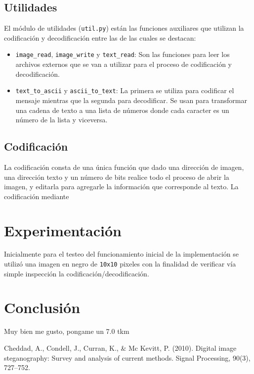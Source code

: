 \documentclass[conference]{IEEEtran}
\begin{document}
	\subsection*{Utilidades}
	El módulo de utilidades (\texttt{util.py}) están las funciones auxiliares que utilizan la codificación y decodificación entre las de las cuales se destacan:
	\begin{itemize}
	    \item \texttt{image\_read}\footnotemark, \texttt{image\_write} y \texttt{text\_read}: Son las funciones para leer los archivos externos que se van a utilizar para el proceso de codificación y decodificación.
         
	    	    
        \item \texttt{text\_to\_ascii} y \texttt{ascii\_to\_text}: La primera se utiliza para codificar el mensaje mientras que la segunda para decodificar. Se usan para transformar una cadena de texto a una lista de números donde cada caracter es un número de la lista y viceversa.
        
	\end{itemize}
	
    	
	
	\subsection*{Codificación}
        La codificación consta de una única función que dado una dirección de imagen, una dirección texto y un número de bits realice todo el proceso de abrir la imagen, y editarla para agregarle la información que corresponde al texto.
        La codificación mediante
	
\section*{Experimentación}
    Inicialmente para el testeo del funcionamiento inicial de la implementación se utilizó una imagen en negro de \texttt{10x10} pixeles con la finalidad de verificar vía simple inspección la codificación/decodificación.
    
    

\section*{Conclusión}
	Muy bien me gusto, pongame un 7.0 tkm


\begin{thebibliography}{99}
 Cheddad, A., Condell, J., Curran, K., \& Mc Kevitt, P. (2010). Digital image 
steganography: Survey and analysis of current methods. Signal Processing, 90(3), 727–752. 


\end{thebibliography}
\end{document}
